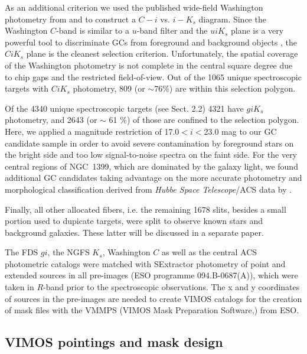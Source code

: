 \documentclass[useAMS,usenatbib]{mn2e}
\begin{document}
As an additional criterion we used the published wide-field Washington photometry from \citet{Dirsch04} and \citet{Bassino} to construct a $C-i$ vs. $i-K_s$ diagram. Since the Washington $C$-band is similar to a $u$-band filter and the $uiK_s$ plane is a very powerful tool to discriminate GCs from foreground and background objects \citep{Munoz14}, the $CiK_s$ plane is the cleanest selection criterion. Unfortunately, the spatial coverage of the Washington photometry is not complete in the central square degree due to chip gaps and the restricted field-of-view. Out of the 1065 unique spectroscopic targets with $CiK_s$ photometry, 809 (or $\sim$76\%) are within this selection polygon.

Of the 4340 unique spectroscopic targets (see Sect. 2.2) 4321 have $giK_s$ photometry, and 2643 (or $\sim$ 61 \%) of those are confined to the selection polygon. 
Here, we applied a magnitude restriction of 17.0$<i<$23.0 mag to our GC candidate sample in order to avoid severe contamination by foreground stars on the bright side and too low signal-to-noise spectra on the faint side. 
For the very central regions of NGC~1399, which are dominated by the galaxy light, we found additional GC candidates taking advantage on the more accurate photometry and morphological classification derived from {\it Hubbe Space Telescope}/ACS data by \citet{Puzia14}.

Finally, all other allocated fibers, i.e. the remaining 1678 slits, besides a small portion used to dupicate targets, were split to observe known stars and background galaxies. These latter will be discussed in a separate paper. 

The FDS $gi$, the NGFS $K_s$, Washington $C$ as well as the central ACS  photometric catalogs were matched with SExtractor photometry of point and extended sources in all pre-images (ESO programme 094.B-0687(A)), which were taken in $R$-band prior to the spectroscopic observations. The x and y coordinates of sources in the pre-images are needed to create VIMOS catalogs for the creation of mask files with the VMMPS (VIMOS Mask Preparation Software,\citealt{Bottini05}) from ESO.

\subsection{VIMOS pointings and mask design}
\label{sec:VIMOSpointings}
\end{document}
